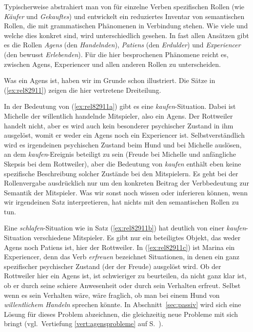 Typischerweise abstrahiert man von für einzelne Verben spezifischen Rollen (wie \textit{Käufer} und \textit{Gekauftes}) und entwickelt ein reduziertes Inventar von semantischen Rollen, die mit grammatischen Phänomenen in Verbindung stehen.
Wie viele und welche dies konkret sind, wird unterschiedlich gesehen.
In fast allen Ansätzen gibt es die Rollen \textit{Agens} (den \textit{Handelnden}), \textit{Patiens} (den \textit{Erdulder}) und \textit{Experiencer} (den bewusst \textit{Erlebenden}).
Für die hier besprochenen Phänomene reicht es, zwischen Agens, Experiencer und allen anderen Rollen zu unterscheiden.

Was ein Agens ist, haben wir im Grunde schon illustriert.
Die Sätze in (\ref{ex:rel82911}) zeigen die hier vertretene Dreiteilung.

\begin{exe}
  \ex\label{ex:rel82911} 
  \begin{xlist}
  \end{xlist}
\end{exe}

In der Bedeutung von (\ref{ex:rel82911a}) gibt es eine \textit{kaufen}-Situation.
Dabei ist Michelle der willentlich handelnde Mitspieler, also ein Agens.
Der Rottweiler handelt nicht, aber es wird auch kein besonderer psychischer Zustand in ihm ausgelöst, womit er weder ein Agens noch ein Experiencer ist.
Selbstverständlich wird es irgendeinen psychischen Zustand beim Hund und bei Michelle auslösen, an dem \textit{kaufen}-Ereignis beteiligt zu sein (\zB Freude bei Michelle und anfängliche Skepsis bei dem Rottweiler), aber die Bedeutung von \textit{kaufen} enthält eben keine spezifische Beschreibung solcher Zustände bei den Mitspielern.
Es geht bei der Rollenvergabe ausdrücklich nur um den konkreten Beitrag der Verbbedeutung zur Semantik der Mitspieler.
Was wir sonst noch wissen oder inferieren können, wenn wir irgendeinen Satz interpretieren, hat nichts mit den semantischen Rollen zu tun.

Eine \textit{schlafen}-Situation wie in Satz (\ref{ex:rel82911b}) hat deutlich von einer \textit{kaufen}-Situation verschiedene Mitspieler.
Es gibt nur ein beteiligtes Objekt, das weder Agens noch Patiens ist, hier der Rottweiler.
In (\ref{ex:rel82911c}) ist Marina ein Experiencer, denn das Verb \textit{erfreuen} bezeichnet Situationen, in denen ein ganz spezifischer psychischer Zustand (der der Freude) ausgelöst wird.
Ob der Rottweiler hier ein Agens ist, ist schwieriger zu beurteilen, da nicht ganz klar ist, ob er durch seine schiere Anwesenheit oder durch sein Verhalten erfreut.
Selbst wenn es sein Verhalten wäre, wäre fraglich, ob man bei einem Hund von \textit{willentlichem Handeln} sprechen könnte.
In Abschnitt~\ref{sec:passiv} wird sich eine Lösung für dieses Problem abzeichnen, die gleichzeitig neue Probleme mit sich bringt (vgl.\ Vertiefung \ref{vert:agensprobleme} auf S.~\pageref{vert:agensprobleme}).

